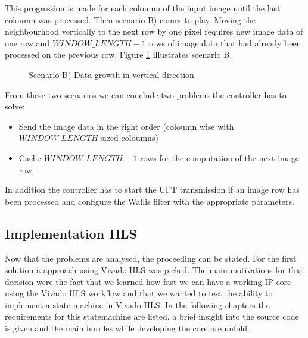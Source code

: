 This progression is made for each coloumn of the input image until the last
coloumn was processed. Then scenario B) comes to play. Moving the neighbourhood
vertically to the next row by one pixel requires new image data of one row
and $WINDOW\_LENGTH-1$ rows of image data that had already been processed on the
previous row. Figure \ref{fig:memproblemgrowthy} illustrates scenario B.

\begin{figure}[H]
    \centering
    \begin{adjustbox}{scale=0.7}
        
    \end{adjustbox}
    \caption{Scenario B) Data growth in vertical direction}
    \label{fig:memproblemgrowthy}
\end{figure}

From these two scenarios we can conclude two problems the controller has to
solve:
\begin{itemize}
    \item Send the image data in the right order (coloumn wise with
    $WINDOW\_LENGTH$ sized coloumns)
    \item Cache $WINDOW\_LENGTH-1$ rows for the computation of the next image
    row
\end{itemize}

In addition the controller has to start the UFT transmission if an image row has
been processed and configure the Wallis filter with the appropriate parameters.

\clearpage

\subsection{Implementation HLS} \label{ch:controller:hls}
Now that the problems are analysed, the proceeding can be stated. For the first
solution a approach using Vivado HLS was picked. The main motivations for this
decision were the fact that we learned how fast we can have a working IP core
using the Vivado HLS workflow and that we wanted to test the ability to
implement a state machine in Vivado HLS. In the following chapters the
requirements for this statemachine are listed, a brief insight into the source
code is given and the main hurdles while developing the core are unfold.

